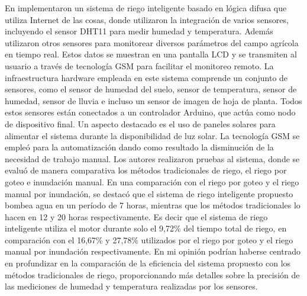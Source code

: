\bigbreak
En \cite{krishnan_fuzzy_2020} implementaron un sistema de riego inteligente basado en lógica difusa que utiliza Internet de las cosas, donde utilizaron la integración de varios sensores, incluyendo el sensor DHT11 para medir humedad y temperatura. Además utilizaron otros sensores para monitorear diversos parámetros del campo agrícola en tiempo real. Estos datos se muestran en una pantalla LCD y se transmiten al usuario a través de tecnología GSM para facilitar el monitoreo remoto. La infraestructura hardware empleada en este sistema comprende un conjunto de sensores, como el sensor de humedad del suelo, sensor de temperatura, sensor de humedad, sensor de lluvia e incluso un sensor de imagen de hoja de planta. Todos estos sensores están conectados a un controlador Arduino, que actúa como nodo de dispositivo final. Un aspecto destacado es el uso de paneles solares para alimentar el sistema durante la disponibilidad de luz solar. La tecnología GSM se empleó para la automatización dando como resultado la disminución de la necesidad de trabajo manual. Los autores realizaron pruebas al sistema, donde se evaluó de manera comparativa los métodos tradicionales de riego, el riego por goteo e inundación manual. En una comparación con el riego por goteo y el riego manual por inundación, se destacó que el sistema de riego inteligente propuesto bombea agua en un período de 7 horas, mientras que los métodos tradicionales lo hacen en 12 y 20 horas respectivamente. Es decir que el sistema de riego inteligente utiliza el motor durante solo el 9,72\% del tiempo total de riego, en comparación con el 16,67\% y 27,78\% utilizados por el riego por goteo y el riego manual por inundación respectivamente. En mi opinión podrían haberse centrado en profundizar en la comparación de la eficiencia del sistema propuesto con los métodos tradicionales de riego, proporcionando más detalles sobre la precisión de las mediciones de humedad y temperatura realizadas por los sensores.

